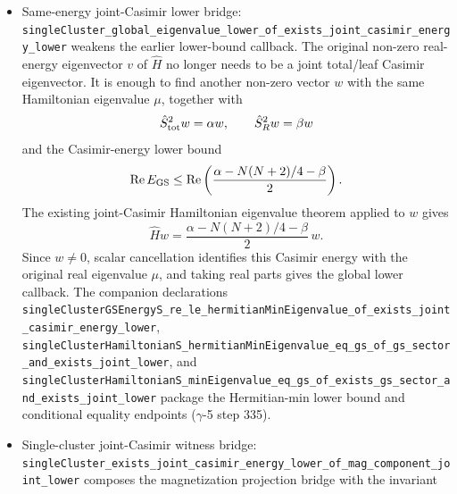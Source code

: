 \documentclass[a4paper,11pt]{article}
\begin{document}
\begin{itemize}
        is invariant under both \(\hat S_{\rm tot}^2\) and \(\hat S_R^2\):
        the eigenspace part is preserved by commutation with \(\hat H\), and
        the magnetization part is preserved by the existing total and
        sublattice Casimir magnetization-preservation theorems.  The theorem
        \texttt{exists\_joint\_casimir\_eigenvector\_in\_singleClusterHamiltonianMagEigenspaceSubmodule}
        then applies the joint invariant-submodule bridge to any non-zero
        such submodule, producing simultaneous total/leaf Casimir eigenvector
        data under the explicit algebraically closed field hypothesis
        \texttt{[IsAlgClosed \(\mathbb C\)]} ($\gamma$-5 step 334).
  \item Same-energy joint-Casimir lower bridge:
        \texttt{singleCluster\_global\_eigenvalue\_lower\_of\_exists\_joint\_casimir\_energy\_lower}
        weakens the earlier lower-bound callback.  The original non-zero
        real-energy eigenvector \(v\) of \(\hat H\) no longer needs to be a
        joint total/leaf Casimir eigenvector.  It is enough to find another
        non-zero vector \(w\) with the same Hamiltonian eigenvalue
        \(\mu\), together with
        \[
          \hat S_{\rm tot}^2 w=\alpha w,\qquad
          \hat S_R^2 w=\beta w
        \]
        and the Casimir-energy lower bound
        \[
          \operatorname{Re} E_{\rm GS}
          \le
          \operatorname{Re}\left(
            \frac{\alpha-N(N+2)/4-\beta}{2}\right).
        \]
        The existing joint-Casimir Hamiltonian eigenvalue theorem applied to
        \(w\) gives
        \[
          \hat H w =
            \frac{\alpha-N(N+2)/4-\beta}{2}\,w.
        \]
        Since \(w\ne0\), scalar cancellation identifies this Casimir energy
        with the original real eigenvalue \(\mu\), and taking real parts gives
        the global lower callback.  The companion declarations
        \texttt{singleClusterGSEnergyS\_re\_le\_hermitianMinEigenvalue\_of\_exists\_joint\_casimir\_energy\_lower},
        \texttt{singleClusterHamiltonianS\_hermitianMinEigenvalue\_eq\_gs\_of\_gs\_sector\_and\_exists\_joint\_lower},
        and
        \texttt{singleClusterHamiltonianS\_minEigenvalue\_eq\_gs\_of\_exists\_gs\_sector\_and\_exists\_joint\_lower}
        package the Hermitian-min lower bound and conditional equality
        endpoints ($\gamma$-5 step 335).
  \item Single-cluster joint-Casimir witness bridge:
        \texttt{singleCluster\_exists\_joint\_casimir\_energy\_lower\_of\_mag\_component\_joint\_lower}
        composes the magnetization projection bridge with the invariant

\end{itemize}
\end{document}
